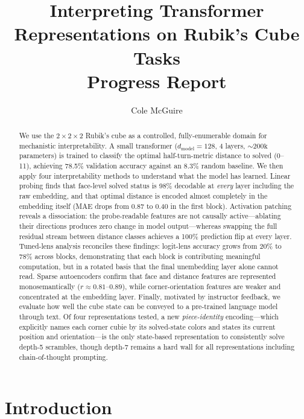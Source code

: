 \documentclass[12pt]{article}
\title{Interpreting Transformer Representations on Rubik's Cube Tasks\\
\large Progress Report}
\author{Cole McGuire}
\date{}
\begin{document}
\maketitle

\begin{abstract}
We use the $2{\times}2{\times}2$ Rubik's cube as a controlled, fully-enumerable
domain for mechanistic interpretability.  A small transformer
($d_\text{model}{=}128$, 4 layers, ${\sim}200\text{k}$ parameters) is trained to
classify the optimal half-turn-metric distance to solved (0--11), achieving
78.5\% validation accuracy against an 8.3\% random baseline.  We then apply
four interpretability methods to understand what the model has learned.  Linear
probing finds that face-level solved status is 98\% decodable at \emph{every}
layer including the raw embedding, and that optimal distance is encoded almost
completely in the embedding itself (MAE drops from 0.87 to 0.40 in the first
block).  Activation patching reveals a dissociation: the probe-readable features
are not causally active---ablating their directions produces zero change in
model output---whereas swapping the full residual stream between distance classes
achieves a 100\% prediction flip at every layer.  Tuned-lens analysis reconciles
these findings: logit-lens accuracy grows from 20\% to 78\% across blocks,
demonstrating that each block is contributing meaningful computation, but in a
rotated basis that the final unembedding layer alone cannot read.  Sparse
autoencoders confirm that face and distance features are represented
monosemantically ($r \approx 0.81$--$0.89$), while corner-orientation features
are weaker and concentrated at the embedding layer.  Finally, motivated by
instructor feedback, we evaluate how well the cube state can be conveyed to a
pre-trained language model through text.  Of four representations tested, a
new \emph{piece-identity} encoding---which explicitly names each corner cubie by
its solved-state colors and states its current position and orientation---is the
only state-based representation to consistently solve depth-5 scrambles, though
depth-7 remains a hard wall for all representations including chain-of-thought
prompting.
\end{abstract}

\section{Introduction}
\end{document}
